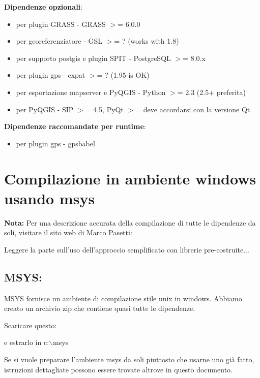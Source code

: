 \textbf{Dipendenze opzionali}:

\begin{itemize}
\item per plugin GRASS - GRASS $>$= 6.0.0
\item per georeferenziatore - GSL $>$= ? (works with 1.8)
\item per supporto postgis e plugin SPIT - PostgreSQL $>$= 8.0.x
\item per plugin gps - expat $>$= ? (1.95 is OK)
\item per esportazione mapserver e PyQGIS - Python $>$= 2.3 (2.5+ preferita)
\item per PyQGIS - SIP $>$= 4.5, PyQt $>$= deve accordarsi con la versione Qt
\end{itemize}

\textbf{Dipendenze raccomandate per runtime}:

\begin{itemize}
\item per plugin gps - gpsbabel
\end{itemize}

\section{Compilazione in ambiente windows usando msys}\label{sec:install_windows}
\textbf{Nota:} Per una descrizione accurata della compilazione di tutte le dipendenze da soli, visitare il sito web di Marco Pasetti:


Leggere la parte sull'uso dell'approccio semplificato con librerie pre-costruite...

\subsection{MSYS:}
MSYS fornisce un ambiente di compilazione stile unix in windows. Abbiamo creato un archivio zip che contiene quasi tutte le dipendenze.

Scaricare questo: 


e estrarlo in c:$\backslash$msys

Se si vuole preparare l'ambiente msys da soli piuttosto che usarne uno già fatto, istruzioni dettagliate possono essere trovate altrove in questo documento.

